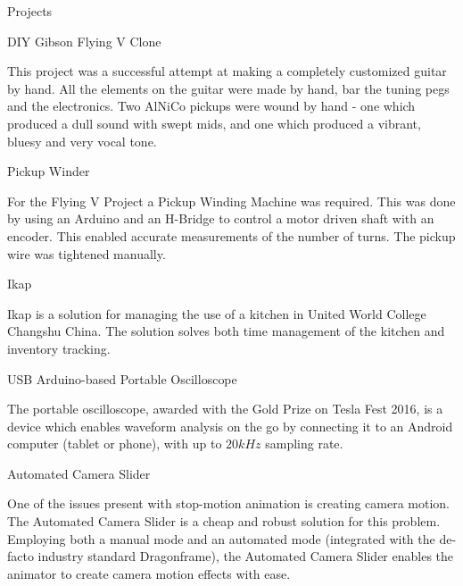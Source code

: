 \documentclass{resume}
\begin{document}
\begin{rSection}{Projects}

\begin{rSubsection}{DIY Gibson Flying V Clone}{}{}{}
\item This project was a successful attempt at making a completely customized guitar by hand. All the elements on the guitar were made by hand, bar the tuning pegs and the electronics. Two AlNiCo pickups were wound by hand - one which produced a dull sound with swept mids, and one which produced a vibrant, bluesy and very vocal tone.
\end{rSubsection}

\begin{rSubsection}{Pickup Winder}{}{}{}
\item For the Flying V Project a Pickup Winding Machine was required. This was done by using an Arduino and an H-Bridge to control a motor driven shaft with an encoder. This enabled accurate measurements of the number of turns. The pickup wire was tightened manually.
\end{rSubsection}

\begin{rSubsection}{Ikap}{}{}{}
\item Ikap is a solution for managing the use of a kitchen in United World College Changshu China. The solution solves both time management of the kitchen and inventory tracking.
\end{rSubsection}

\begin{rSubsection}{USB Arduino-based Portable Oscilloscope}{}{}{}
\item The portable oscilloscope, awarded with the Gold Prize on Tesla Fest 2016, is a device which enables waveform analysis on the go by connecting it to an Android computer (tablet or phone), with up to $20\si{kHz}$ sampling rate.
\end{rSubsection}

\begin{rSubsection}{Automated Camera Slider}{}{}{}
\item One of the issues present with stop-motion animation is creating camera motion. The Automated Camera Slider is a cheap and robust solution for this problem. Employing both a manual mode and an automated mode (integrated with the de-facto industry standard Dragonframe), the Automated Camera Slider enables the animator to create camera motion effects with ease.
\end{rSubsection}

\end{rSection}
\end{document}
